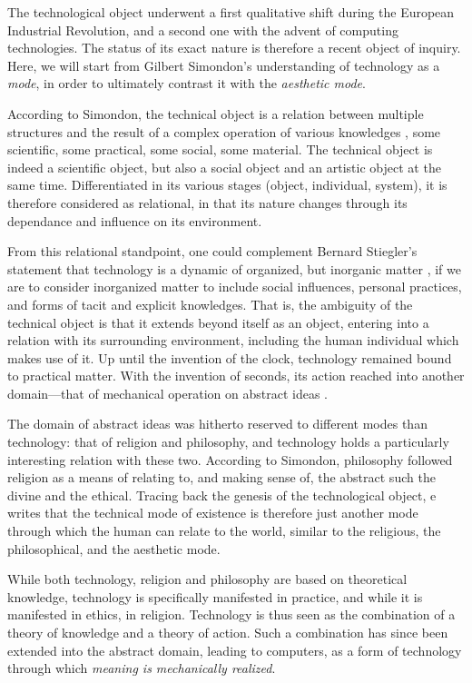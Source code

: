 The technological object underwent a first qualitative shift during the European Industrial Revolution, and a second one with the advent of computing technologies. The status of its exact nature is therefore a recent object of inquiry. Here, we will start from Gilbert Simondon's understanding of technology as a \emph{mode}, in order to ultimately contrast it with the \emph{aesthetic mode}.

According to Simondon, the technical object is a relation between multiple structures and the result of a complex operation of various knowledges \citep{simondon_mode_1958}, some scientific, some practical, some social, some material. The technical object is indeed a scientific object, but also a social object and an artistic object at the same time. Differentiated in its various stages (object, individual, system), it is therefore considered as relational, in that its nature changes through its dependance and influence on its environment.

From this relational standpoint, one could complement Bernard Stiegler's statement that technology is a dynamic of organized, but inorganic matter \citep{stiegler_technics_1998}, if we are to consider inorganized matter to include social influences, personal practices, and forms of tacit and explicit knowledges. That is, the ambiguity of the technical object is that it extends beyond itself as an object, entering into a relation with its surrounding environment, including the human individual which makes use of it. Up until the invention of the clock, technology remained bound to practical matter. With the invention of seconds, its action reached into another domain—that of mechanical operation on abstract ideas \citep{mumford_technics_1934}.

The domain of abstract ideas was hitherto reserved to different modes than technology: that of religion and philosophy, and technology holds a particularly interesting relation with these two. According to Simondon, philosophy followed religion as a means of relating to, and making sense of, the abstract such the divine and the ethical. Tracing back the genesis of the technological object, e writes that the technical mode of existence is therefore just another mode through which the human can relate to the world, similar to the religious, the philosophical, and the aesthetic mode\citep{simondon_mode_1958}.

While both technology, religion and philosophy are based on theoretical knowledge, technology is specifically manifested in practice, and while it is manifested in ethics, in religion. Technology is thus seen as the combination of a theory of knowledge and a theory of action. Such a combination has since been extended into the abstract domain, leading to computers, as a form of technology through which \emph{meaning is mechanically realized}.

